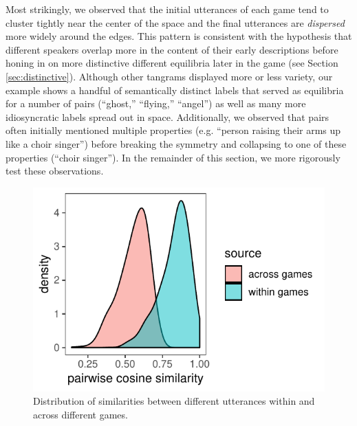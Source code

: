 \documentclass[alpha-refs]{wiley-article}
\begin{document}
Most strikingly, we observed that the initial utterances of each game tend to cluster tightly near the center of the space and the final utterances are \emph{dispersed} more widely around the edges. 
This pattern is consistent with the hypothesis that different speakers overlap more in the content of their early descriptions before honing in on more distinctive different equilibria later in the game (see Section \ref{sec:distinctive}). 
Although other tangrams displayed more or less variety, our example shows a handful of semantically distinct labels that served as equilibria for a number of pairs (``ghost,'' ``flying,'' ``angel'') as well as many more idiosyncratic labels spread out in space.
Additionally, we observed that pairs often initially mentioned multiple properties (e.g. ``person raising their arms up like a choir singer'') before breaking the symmetry and collapsing to one of these properties (``choir singer'').
In the remainder of this section, we more rigorously test these observations.

\begin{figure}[t!]
\centering
\includegraphics[scale=.75]{across_vs_within.pdf}
\caption{Distribution of similarities between different utterances within and across different games.}
\label{fig:withinvsacross}
\end{figure}
\end{document}
